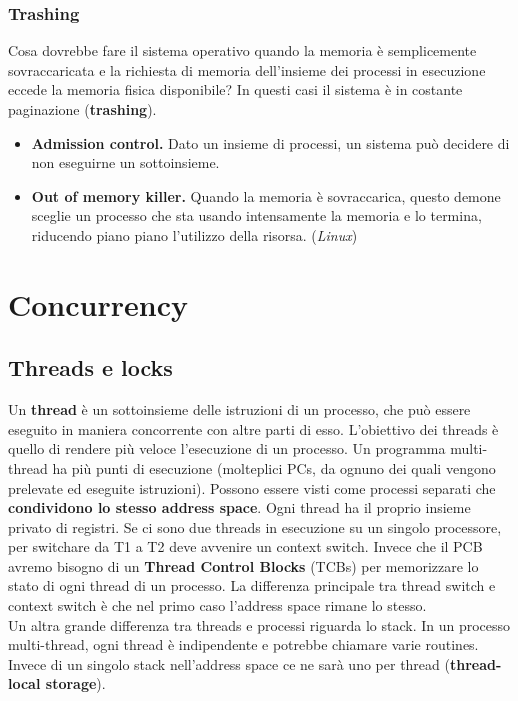 \documentclass[12pt, twoside, letterpaper]{article}
\begin{document}
			\subsubsection{Trashing}
				Cosa dovrebbe fare il sistema operativo quando la memoria è semplicemente sovraccaricata e la richiesta di memoria dell'insieme dei processi in esecuzione eccede la memoria fisica disponibile? In questi casi il sistema è in costante paginazione (\textbf{trashing}). 
				\begin{itemize}
					\item \textbf{Admission control.} Dato un insieme di processi, un sistema può decidere di non eseguirne un sottoinsieme.
					\item \textbf{Out of memory killer.} Quando la memoria è sovraccarica, questo demone sceglie un processo che sta usando intensamente la memoria e lo termina, riducendo piano piano l'utilizzo della risorsa. (\textit{Linux})
				\end{itemize}
	\newpage	
	\section{Concurrency}
		\subsection{Threads e locks}
			Un \textbf{thread }è un sottoinsieme delle istruzioni di un processo, che può essere eseguito in maniera concorrente con altre parti di esso. L’obiettivo dei threads è quello di rendere più veloce l’esecuzione di un processo. Un programma multi-thread ha più punti di esecuzione (molteplici PCs, da ognuno dei quali vengono prelevate ed eseguite istruzioni). Possono essere visti come processi separati che \textbf{condividono lo stesso address space}. Ogni thread ha il proprio insieme privato di registri. Se ci sono due threads in esecuzione su un singolo processore, per switchare da T1 a T2 deve avvenire un context switch. Invece che il PCB avremo bisogno di un \textbf{Thread Control Blocks} (TCBs) per memorizzare lo stato di ogni thread di un processo. La differenza principale tra thread switch e context switch è che nel primo caso l'address space rimane lo stesso.\\
			Un altra grande differenza tra threads e processi riguarda lo stack. In un processo multi-thread, ogni thread è indipendente e potrebbe chiamare varie routines. Invece di un singolo stack nell'address space ce ne sarà uno per thread (\textbf{thread-local storage}).\\
			
\end{document}
